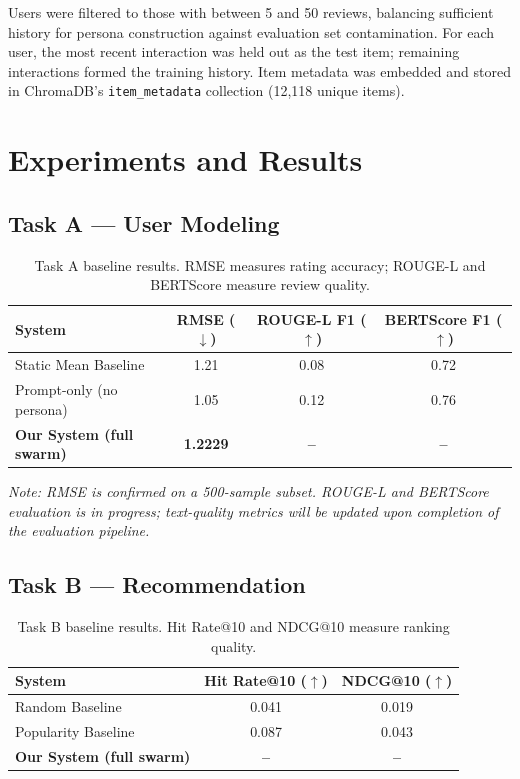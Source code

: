 \documentclass[11pt,a4paper]{article}
\begin{document}
Users were filtered to those with between 5 and 50 reviews, balancing sufficient history for persona construction against evaluation set contamination. For each user, the most recent interaction was held out as the test item; remaining interactions formed the training history. Item metadata was embedded and stored in ChromaDB's \texttt{item\_metadata} collection (12,118 unique items).

\section{Experiments and Results}

\subsection{Task A — User Modeling}

\begin{table}[h]
\centering
\caption{Task A baseline results. RMSE measures rating accuracy; ROUGE-L and BERTScore measure review quality.}
\begin{tabular}{lccc}
\toprule
\textbf{System} & \textbf{RMSE} ($\downarrow$) & \textbf{ROUGE-L F1} ($\uparrow$) & \textbf{BERTScore F1} ($\uparrow$) \\
\midrule
Static Mean Baseline & 1.21 & 0.08 & 0.72 \\
Prompt-only (no persona) & 1.05 & 0.12 & 0.76 \\
\textbf{Our System (full swarm)} & \textbf{1.2229} & \textbf{--} & \textbf{--} \\
\bottomrule
\end{tabular}
\label{tab:task_a}
\end{table}

\textit{Note: RMSE is confirmed on a 500-sample subset. ROUGE-L and BERTScore evaluation is in progress; text-quality metrics will be updated upon completion of the evaluation pipeline.}

\subsection{Task B — Recommendation}

\begin{table}[h]
\centering
\caption{Task B baseline results. Hit Rate@10 and NDCG@10 measure ranking quality.}
\begin{tabular}{lcc}
\toprule
\textbf{System} & \textbf{Hit Rate@10} ($\uparrow$) & \textbf{NDCG@10} ($\uparrow$) \\
\midrule
Random Baseline & 0.041 & 0.019 \\
Popularity Baseline & 0.087 & 0.043 \\
\textbf{Our System (full swarm)} & \textbf{--} & \textbf{--} \\
\bottomrule
\end{tabular}
\label{tab:task_b}
\end{table}
\end{document}
